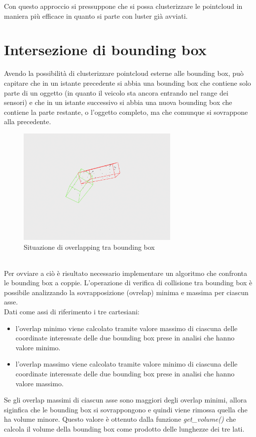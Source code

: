 \documentclass[italian]{report}
\begin{document}
Con questo approccio si pressuppone che si possa clusterizzare le pointcloud in maniera più efficace in quanto si parte con luster già avviati.\\
\section{Intersezione di bounding box}
Avendo la possibilità di clusterizzare pointcloud esterne alle bounding box, può capitare che in un istante precedente si abbia una bounding box che contiene solo parte di un oggetto (in quanto il veicolo sta ancora entrando nel range dei sensori) e che in un istante successivo si abbia una nuova bounding box che contiene la parte restante, o l'oggetto completo, ma che comunque si sovrappone alla precedente.\\
\begin{figure}[H]
	\centering
	\includegraphics[width=0.7\textwidth]{Overlapping}
	\footnotesize
	\caption{Situazione di overlapping tra bounding box}
\end{figure}\\
Per ovviare a ciò è risultato necessario implementare un algoritmo che confronta le bounding box a coppie. L'operazione di verifica di collisione tra bounding box è possibile analizzando la sovrapposizione (ovrelap) minima e massima per ciascun asse.\\
Dati come assi di riferimento i tre cartesiani:
\begin{itemize}
	\item l'overlap minimo viene calcolato tramite valore massimo di ciascuna delle coordinate interessate delle due bounding box prese in analisi che hanno valore minimo.
	\item l'overlap massimo viene calcolato tramite valore minimo di ciascuna delle coordinate interessate delle due bounding box prese in analisi che hanno valore massimo.
\end{itemize}
Se gli overlap massimi di ciascun asse sono maggiori degli overlap minimi, allora siginfica che le bounding box si sovrappongono e quindi viene rimossa quella che ha volume minore. Questo valore è ottenuto dalla funzione \textit{get\_volume()} che calcola il volume della bounding box come prodotto delle lunghezze dei tre lati.\\
\end{document}
